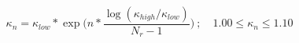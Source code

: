 \begin{center}
    \begin{equation}
        \kappa_{n}=\kappa_{low}*\exp{ \biggl(n*\frac{\log(\kappa_{high}/\kappa_{low})}{N_{r}-1}\biggr)} \ ; \quad 1.00 \leq \kappa_{n} \leq 1.10
    \label{eq:kappa_scaling}
    \end{equation}
\end{center}